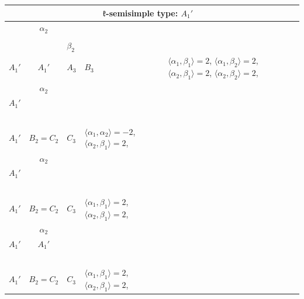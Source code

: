 \documentclass[12pt]{report}
\begin{document}
\begin{appendix}
{\begin{longtable}{rcl p{1cm}p{1cm}p{3cm} }
\\
\hline\multicolumn{5}{c}{$\mathfrak{k}$-semisimple type: $A_1'$}\\
\hline\hline\begin{tabular}{cc}$\alpha_1$+ & $\alpha_2$\\\tiny{  } & \tiny{  }\end{tabular} &\begin{tabular}{c} = \\~ \end{tabular} & \begin{tabular}{cc}$\beta_1$+ & $\beta_2$\\\tiny{ $A_1'$ } & \tiny{ $A_1'$ }\end{tabular} & $A_3$ & $B_3$ &  $\langle\alpha_1, \beta_1\rangle=2$, $\langle\alpha_1, \beta_2\rangle=2$, $\langle\alpha_2, \beta_1\rangle=2$, $\langle\alpha_2, \beta_2\rangle=2$, 
\\
\begin{tabular}{cc}$\alpha_1$+ & $\alpha_2$\\\tiny{ $A_1'$ } & \tiny{  }\end{tabular} &\begin{tabular}{c} = \\~ \end{tabular} & \begin{tabular}{c}$\beta_1$\\\tiny{ $A_1'$ }\end{tabular} & $B_2=C_2$ & $C_3$ & $\langle\alpha_1, \alpha_2\rangle=-2$,  $\langle\alpha_2, \beta_1\rangle=2$, 
\\
\begin{tabular}{cc}$\alpha_1$+ & $\alpha_2$\\\tiny{ $A_1'$ } & \tiny{  }\end{tabular} &\begin{tabular}{c} = \\~ \end{tabular} & \begin{tabular}{c}2$\beta_1$\\\tiny{ $A_1'$ }\end{tabular} & $B_2=C_2$ & $C_3$ &  $\langle\alpha_1, \beta_1\rangle=2$, $\langle\alpha_2, \beta_1\rangle=2$, 
\\
\begin{tabular}{cc}$\alpha_1$+ & $\alpha_2$\\\tiny{ $A_1'$ } & \tiny{ $A_1'$ }\end{tabular} &\begin{tabular}{c} = \\~ \end{tabular} & \begin{tabular}{c}$\beta_1$\\\tiny{ $A_1'$ }\end{tabular} & $B_2=C_2$ & $C_3$ &  $\langle\alpha_1, \beta_1\rangle=2$, $\langle\alpha_2, \beta_1\rangle=2$, 

\end{longtable}}
\end{appendix}
\end{document}
